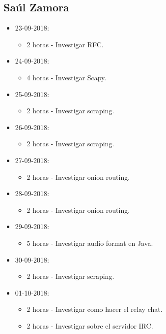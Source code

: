 \documentclass{article}
\begin{document}
\subsection{Sa\'ul Zamora}
\begin{itemize}
  \item 23-09-2018:
  \begin{itemize}
    \item 2 horas - Investigar RFC.
  \end{itemize}
  \item 24-09-2018:
  \begin{itemize}
    \item 4 horas - Investigar Scapy.
  \end{itemize}
  \item 25-09-2018:
  \begin{itemize}
    \item 2 horas - Investigar scraping.
  \end{itemize}
  \item 26-09-2018:
  \begin{itemize}
    \item 2 horas - Investigar scraping.
  \end{itemize}
  \item 27-09-2018:
  \begin{itemize}
    \item 2 horas - Investigar onion routing.
  \end{itemize}
  \item 28-09-2018:
  \begin{itemize}
    \item 2 horas - Investigar onion routing.
  \end{itemize}
  \item 29-09-2018:
  \begin{itemize}
    \item 5 horas - Investigar audio format en Java.
  \end{itemize}
  \item 30-09-2018:
  \begin{itemize}
    \item 2 horas - Investigar scraping.
  \end{itemize}
  \item 01-10-2018:
  \begin{itemize}
    \item 2 horas - Investigar como hacer el relay chat.
    \item 2 horas - Investigar sobre el servidor IRC.

\end{itemize}
\end{itemize}
\end{document}
